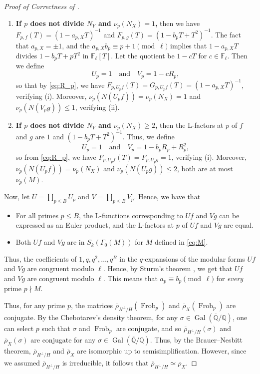 \documentclass{amsproc}
\numberwithin{equation}{section}
\theoremstyle{definition}
\theoremstyle{remark}
\DeclareMathOperator{\Frob}{Frob}
\DeclareMathOperator{\Gal}{Gal}
\newcommand{\QQ}{\mathbb Q}
\newcommand{\FF}{\mathbb F}
\newcommand{\rhoHperpH}{\overline\rho_{H^\perp\!/H}}
\begin{document}
\begin{proof}[Proof of Correctness of ]
\begin{enumerate}
    Then we have $F_{p,f}(T) = (1-a_{p,X}T + pT^2)^{-1}$ and $F_{p,g}(T) = (1-b_pT + pT^2)^{-1}$, which are automatically congruent modulo $\ell$. 
    Thus, we can define $U_p=V_p=1$, so the levels of $U_pf$ and $V_pg$ are not divisible by $p$.
    Both (i) and (ii) are then satisfied.
    \item \textbf{If $p$ does not divide $N_Y$ and $\nu_p(N_X)=1$,}
    then we have
    $F_{p,f}(T) = (1-a_{p,X}T)^{-1}$ and $F_{p,g}(T) = (1-b_pT + T^2)^{-1}$.
    The fact that $a_{p,X}=\pm 1$, and the $a_{p,X} b_p\equiv p+1\pmod{\ell}$
    implies that $1-a_{p,X}T$ divides $1-b_pT + pT^2$
    in $\FF_\ell[T]$.
    Let the quotient be $1-cT$ for $c\in\FF_\ell$. Then we define
    $$U_p = 1\quad\text{and}\quad V_p = 1-cR_p,$$
    so that by \eqref{eq:R_p}, we have 
    $F_{p,U_pf}(T) = G_{p, U_pf}(T) = (1-a_{p,X}T)^{-1}$,
    verifying (i).
    Moreover, $\nu_p(N(U_pf)) = \nu_p(N_X) = 1$
    and $\nu_p(N(V_p g)) \leq 1$,
    verifying (ii).
    \item \textbf{If $p$ does not divide $N_Y$ and $\nu_p(N_X)\geq 2$,}
    then the L-factors at $p$ of $f$ and $g$ are
    $1$ and $(1-b_pT+T^2)^{-1}$. Thus, we define
    $$U_p = 1\quad\text{and}\quad V_p = 1-b_pR_p+R_p^2,$$
    so from \eqref{eq:R_p}, we have $F_{p,U_pf}(T) = 
    F_{p, U_pg} = 1$, verifying (i).
    Moreover, $\nu_p(N(U_pf)) = \nu_p(N_X)$
    and $\nu_p(N(U_pg)) \leq 2$, both are at most $\nu_p(M)$.
    \end{enumerate}
    Now, let $U = \prod_{p\leq B} U_p$ and $V=\prod_{p\leq B} V_p$.
    Hence, we have that 
    \begin{itemize}
        \item For all primes $p\leq B$, the L-functions corresponding to $Uf$ and $Vg$ can be expressed as an Euler product, and
        the L-factors at $p$ of $Uf$ and $Vg$ are equal.
        \item Both $Uf$ and $Vg$ are in $S_k(\Gamma_0(M))$ for $M$ defined in \eqref{eq:M}.
    \end{itemize} 
    Thus, the coefficients of $1,q, q^2, \dots,q^B$ in the $q$-expansions of the modular forms $Uf$ and $Vg$ are congruent modulo $\ell$.
    Hence, by Sturm's theorem \cite[Thm.~1]{original_sturm_bound}, we get that $Uf$ and $Vg$ are congruent modulo $\ell$.
    This means that $a_p\equiv b_p\pmod \ell$ for \emph{every} prime $p\nmid M$.
    
    Thus, for any prime $p$, the matrices $\rhoHperpH(\Frob_p)$ and $\overline\rho_X(\Frob_p)$ are conjugate.
    By the Chebotarev's density theorem, for any $\sigma\in\Gal(\overline{\QQ}/\QQ)$,
    one can select $p$ such that $\sigma$ and $\Frob_p$ are conjugate,
    and so $\rhoHperpH(\sigma)$ and $\overline\rho_X(\sigma)$
    are conjugate for any $\sigma\in\Gal(\overline{\QQ}/\QQ)$.
    Thus, by the Brauer–Nesbitt theorem, $\rhoHperpH$ and $\overline\rho_X$ are isomorphic up to semisimplification. However, since we assumed $\rhoHperpH$ is irreducible, it follows that $\rhoHperpH\simeq\rho_X$.
\end{proof}
\end{document}
